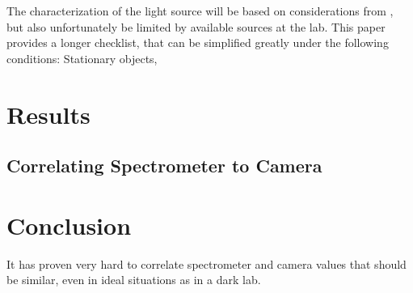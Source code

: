 \documentclass{article}
\begin{document}
The characterization of the light source will be based on considerations from \cite{martinPracticalGuideMachine}, but also unfortunately be limited by available sources at the lab. This paper provides a longer checklist, that can be simplified greatly under the following conditions: Stationary objects,





\section{Results}

\subsection{Correlating Spectrometer to Camera}


\section{Conclusion}

It has proven very hard to correlate spectrometer and camera values that should be similar, even in ideal situations as in a dark lab.



\end{document}
